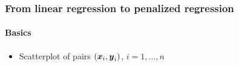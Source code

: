 \documentclass[11pt]{beamer}
\newcommand{\bfx}{\mbox{\boldmath $x$}}
\newcommand{\bfy}{\mbox{\boldmath $y$}}
\begin{document}
\begin{frame}
 \frametitle{From linear regression to penalized regression}
 	\framesubtitle{\quad Basics}
 \vspace{-.cm}
 
{\footnotesize
\begin{itemize}
\item Scatterplot of pairs $(\bfx_i,\bfy_i)$, $i=1,...,n$
\end{itemize}

\vspace{-.1cm}
\begin{minipage}[c]{.525\columnwidth}
\end{minipage}}
\end{frame}
\end{document}
